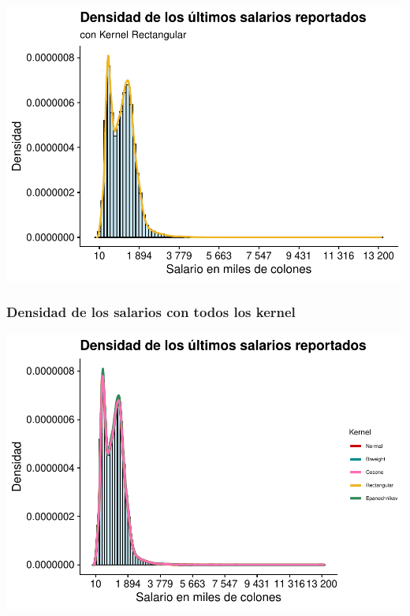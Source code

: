 \documentclass[
]{article}
\begin{document}
\includegraphics{Tarea1_files/figure-latex/unnamed-chunk-14-1.pdf}

\hypertarget{densidad-de-los-salarios-con-todos-los-kernel}{%
\subsubsection{Densidad de los salarios con todos los
kernel}\label{densidad-de-los-salarios-con-todos-los-kernel}}

\includegraphics{Tarea1_files/figure-latex/unnamed-chunk-15-1.pdf}
\end{document}
